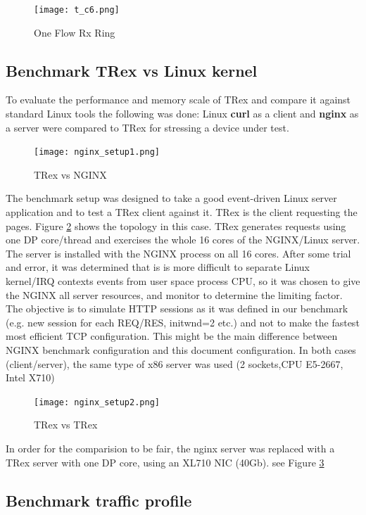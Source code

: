 \documentclass[conference]{IEEEtran}
\begin{document}
\begin{figure}[h]
  \texttt{[image: t\_c6.png]}
  \caption{One Flow Rx Ring}
  \label{fig:rx_ring}
\end{figure}


\subsection{Benchmark  TRex vs Linux kernel}

To evaluate the performance and memory scale of TRex and compare it against standard Linux tools the following was done: 
Linux \textbf{curl} as a client and \textbf{nginx} as a server were compared to TRex for stressing a device under test.

\begin{figure}[h]
  \texttt{[image: nginx\_setup1.png]}
  \caption{TRex vs NGINX}
  \label{fig:trex_nginx}
\end{figure}

The benchmark setup was designed to take a good event-driven Linux server application and to test a TRex client against it. 
TRex is the client requesting the pages. Figure \ref{fig:trex_nginx} shows the topology in this case.
TRex generates requests using one DP core/thread and exercises the whole 16 cores of the NGINX/Linux server. 
The server is installed with the NGINX process on all 16 cores.  
After some trial and error, it was determined that is is more difficult to separate Linux kernel/IRQ contexts events from user space process CPU, 
so it was chosen to give the NGINX all server resources, and monitor to determine the limiting factor.
The objective is to simulate HTTP sessions as it was defined in our benchmark (e.g. new session for each REQ/RES, initwnd=2 etc.) 
and not to make the fastest most efficient TCP configuration. 
This might be the main difference between NGINX benchmark configuration and this document configuration. 
In both cases (client/server), the same type of x86 server was used (2 sockets,CPU E5-2667, Intel X710)

\begin{figure}[h]
  \texttt{[image: nginx\_setup2.png]}
  \caption{TRex vs TRex}
  \label{fig:trex_vs_trex}
\end{figure}

In order for the comparision to be fair, the nginx server was replaced with a TRex server with one DP core, using an XL710 NIC (40Gb). 
see Figure \ref{fig:trex_vs_trex}

\subsection{Benchmark traffic profile}
\end{document}
